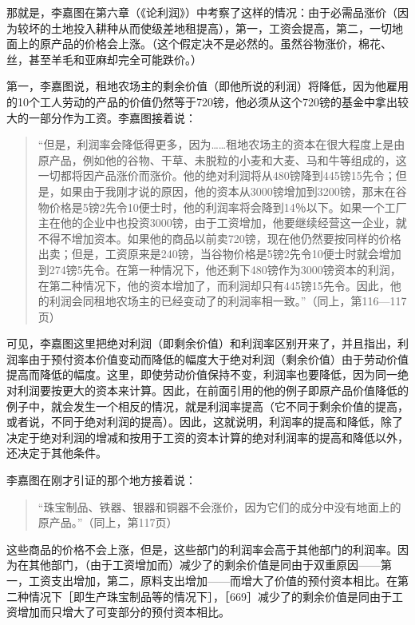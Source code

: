 那就是，李嘉图在第六章（《论利润》）中考察了这样的情况：由于必需品涨价（因为较坏的土地投入耕种从而使级差地租提高），第一，工资会提高，第二，一切地面上的原产品的价格会上涨。（这个假定决不是必然的。虽然谷物涨价，棉花、丝，甚至羊毛和亚麻却完全可能跌价。）

第一，李嘉图说，租地农场主的剩余价值（即他所说的利润）将降低，因为他雇用的10个工人劳动的产品的价值仍然等于720镑，他必须从这个720镑的基金中拿出较大的一部分作为工资。李嘉图接着说：

\begin{quote}{“但是，利润率会降低得更多，因为……租地农场主的资本在很大程度上是由原产品，例如他的谷物、干草、未脱粒的小麦和大麦、马和牛等组成的，这一切都将因产品涨价而涨价。他的绝对利润将从480镑降到445镑15先令；但是，如果由于我刚才说的原因，他的资本从3000镑增加到3200镑，那末在谷物价格是5镑2先令10便士时，他的利润率将会降到14％以下。如果一个工厂主在他的企业中也投资3000镑，由于工资增加，他要继续经营这一企业，就不得不增加资本。如果他的商品以前卖720镑，现在他仍然要按同样的价格出卖；但是，工资原来是240镑，当谷物价格是5镑2先令10便士时就会增加到274镑5先令。在第一种情况下，他还剩下480镑作为3000镑资本的利润，在第二种情况下，他的资本增加了，而利润却只有445镑15先令。因此，他的利润会同租地农场主的已经变动了的利润率相一致。”（同上，第116—117页）}\end{quote}

可见，李嘉图这里把绝对利润（即剩余价值）和利润率区别开来了，并且指出，利润率由于预付资本价值变动而降低的幅度大于绝对利润（剩余价值）由于劳动价值提高而降低的幅度。这里，即使劳动价值保持不变，利润率也要降低，因为同一绝对利润要按更大的资本来计算。因此，在前面引用的他的例子即原产品价值降低的例子中，就会发生一个相反的情况，就是利润率提高（它不同于剩余价值的提高，或者说，不同于绝对利润的提高）。因此，这就说明，利润率的提高和降低，除了决定于绝对利润的增减和按用于工资的资本计算的绝对利润率的提高和降低以外，还决定于其他条件。

李嘉图在刚才引证的那个地方接着说：

\begin{quote}{“珠宝制品、铁器、银器和铜器不会涨价，因为它们的成分中没有地面上的原产品。”（同上，第117页）}\end{quote}

这些商品的价格不会上涨，但是，这些部门的利润率会高于其他部门的利润率。因为在其他部门，（由于工资增加而）减少了的剩余价值是同由于双重原因——第一，工资支出增加，第二，原料支出增加——而增大了价值的预付资本相比。在第二种情况下［即生产珠宝制品等的情况下］，［669］减少了的剩余价值是同由于工资增加而只增大了可变部分的预付资本相比。

